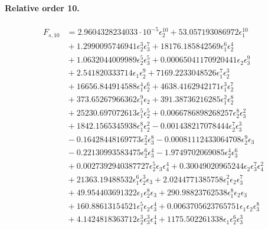 \documentclass[10pt]{article}
\begin{document}
\paragraph{Relative order 10.}
\begin{align*}
F_{s,10} &= 2.9604328234033 \cdot 10^{-5} \epsilon_{2}^{10} + 53.057193086972 \epsilon_{1}^{10} \\
&{}  + 1.2990095746941 \epsilon_{2}^{3} \epsilon_{3}^{7} + 18176.185842569 \epsilon_{1}^{6} \epsilon_{2}^{4} \\
&{}  + 1.0632044009989 \epsilon_{2}^{5} \epsilon_{3}^{5} + 0.00065041170920441 \epsilon_{2} \epsilon_{3}^{9} \\
&{}  + 2.541820333714 \epsilon_{1} \epsilon_{2}^{9} + 7169.2233048526 \epsilon_{1}^{7} \epsilon_{2}^{3} \\
&{}  + 16656.844914588 \epsilon_{1}^{4} \epsilon_{2}^{6} + 4638.4162942171 \epsilon_{1}^{3} \epsilon_{2}^{7} \\
&{}  + 373.65267966362 \epsilon_{1}^{9} \epsilon_{2} + 391.38736216285 \epsilon_{1}^{2} \epsilon_{2}^{8} \\
&{}  + 25230.697072613 \epsilon_{1}^{5} \epsilon_{2}^{5} + 0.0066786898268257 \epsilon_{2}^{8} \epsilon_{3}^{2} \\
&{}  + 1842.1565345938 \epsilon_{1}^{8} \epsilon_{2}^{2} - 0.001438217078444 \epsilon_{2}^{7} \epsilon_{3}^{3} \\
&{}  - 0.16428448169773 \epsilon_{2}^{2} \epsilon_{3}^{8} - 0.00081112433064708 \epsilon_{2}^{9} \epsilon_{3} \\
&{}  - 0.22130993583475 \epsilon_{2}^{6} \epsilon_{3}^{4} - 1.9749702069085 \epsilon_{2}^{4} \epsilon_{3}^{6} \\
&{}  + 0.0027392940387727 \epsilon_{2}^{5} \epsilon_{3} \epsilon_{4}^{4} + 0.30049020965244 \epsilon_{2} \epsilon_{3}^{7} \epsilon_{4}^{2} \\
&{}  + 21363.19488532 \epsilon_{1}^{6} \epsilon_{2}^{3} \epsilon_{3} + 2.0244771385758 \epsilon_{1}^{2} \epsilon_{2} \epsilon_{3}^{7} \\
&{}  + 49.954403691322 \epsilon_{1} \epsilon_{2}^{8} \epsilon_{3} + 290.98823762538 \epsilon_{1}^{8} \epsilon_{2} \epsilon_{3} \\
&{}  + 160.88613154521 \epsilon_{1}^{5} \epsilon_{2} \epsilon_{3}^{4} + 0.0063705623765751 \epsilon_{1} \epsilon_{2} \epsilon_{3}^{8} \\
&{}  + 4.1424818363712 \epsilon_{2}^{3} \epsilon_{3}^{3} \epsilon_{4}^{4} + 1175.502261338 \epsilon_{1} \epsilon_{2}^{6} \epsilon_{3}^{3} \\

\end{align*}
\end{document}
